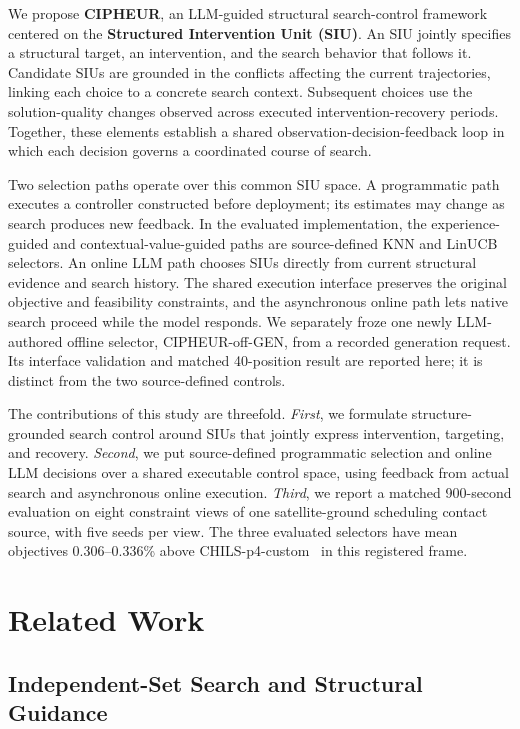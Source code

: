 \documentclass[sigconf,anonymous]{aamas}
\begin{document}
We propose \textbf{CIPHEUR}, an LLM-guided structural search-control framework centered on the \textbf{Structured Intervention Unit (SIU)}. An SIU jointly specifies a structural target, an intervention, and the search behavior that follows it. Candidate SIUs are grounded in the conflicts affecting the current trajectories, linking each choice to a concrete search context. Subsequent choices use the solution-quality changes observed across executed intervention-recovery periods. Together, these elements establish a shared observation-decision-feedback loop in which each decision governs a coordinated course of search.

Two selection paths operate over this common SIU space. A programmatic path executes a controller constructed before deployment; its estimates may change as search produces new feedback. In the evaluated implementation, the experience-guided and contextual-value-guided paths are source-defined KNN and LinUCB selectors. An online LLM path chooses SIUs directly from current structural evidence and search history. The shared execution interface preserves the original objective and feasibility constraints, and the asynchronous online path lets native search proceed while the model responds. We separately froze one newly LLM-authored offline selector, CIPHEUR-off-GEN, from a recorded generation request. Its interface validation and matched 40-position result are reported here; it is distinct from the two source-defined controls.

The contributions of this study are threefold. \emph{First}, we formulate structure-grounded search control around SIUs that jointly express intervention, targeting, and recovery. \emph{Second}, we put source-defined programmatic selection and online LLM decisions over a shared executable control space, using feedback from actual search and asynchronous online execution. \emph{Third}, we report a matched 900-second evaluation on eight constraint views of one satellite-ground scheduling contact source, with five seeds per view. The three evaluated selectors have mean objectives 0.306--0.336\% above CHILS-p4-custom~\cite{grossmann2025chils} in this registered frame.

\section{Related Work}

\subsection{Independent-Set Search and Structural Guidance}
\end{document}
